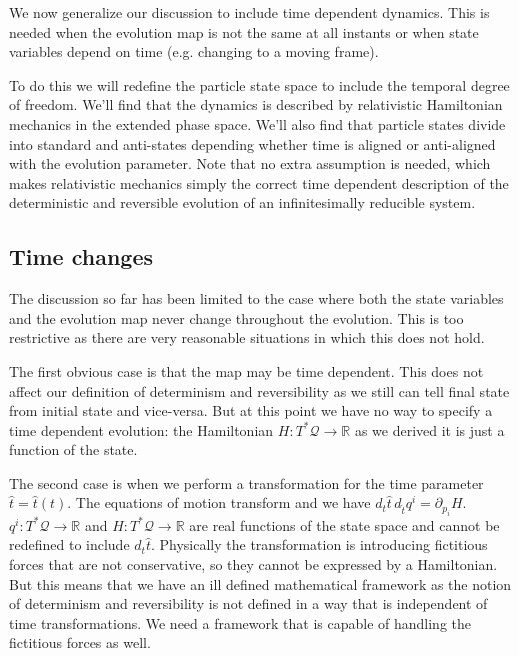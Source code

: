 \documentclass[smallextended]{svjour3}
\numberwithin{equation}{section}
\begin{document}
We now generalize our discussion to include time dependent dynamics. This is needed when the evolution map is not the same at all instants or when state variables depend on time (e.g. changing to a moving frame).

To do this we will redefine the particle state space to include the temporal degree of freedom. We'll find that the dynamics is described by relativistic Hamiltonian mechanics in the extended phase space. We'll also find that particle states divide into standard and anti-states depending whether time is aligned or anti-aligned with the evolution parameter. Note that no extra assumption is needed, which makes relativistic mechanics simply the correct time dependent description of the deterministic and reversible evolution of an infinitesimally reducible system.

\subsection{Time changes}

The discussion so far has been limited to the case where both the state variables and the evolution map never change throughout the evolution. This is too restrictive as there are very reasonable situations in which this does not hold.

The first obvious case is that the map may be time dependent. This does not affect our definition of determinism and reversibility as we still can tell final state from initial state and vice-versa. But at this point we have no way to specify a time dependent evolution: the Hamiltonian $H: T^*\mathcal{Q} \rightarrow \mathbb{R}$ as we derived it is just a function of the state.

The second case is when we perform a transformation for the time parameter $\hat{t}=\hat{t}(t)$. The equations of motion transform and we have $d_{t}\hat{t} \, d_{\hat{t}}q^i = \partial_{p_i} H$. $q^i: T^*\mathcal{Q} \rightarrow \mathbb{R}$ and $H: T^*\mathcal{Q} \rightarrow \mathbb{R}$ are real functions of the state space and cannot be redefined to include $d_{t}\hat{t}$. Physically the transformation is introducing fictitious forces that are not conservative, so they cannot be expressed by a Hamiltonian. But this means that we have an ill defined mathematical framework as the notion of determinism and reversibility is not defined in a way that is independent of time transformations. We need a framework that is capable of handling the fictitious forces as well.
\end{document}
